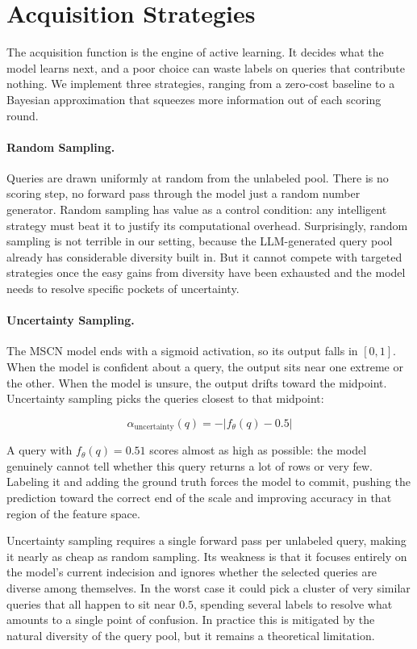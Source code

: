 \section{Acquisition Strategies}

The acquisition function is the engine of active learning. It decides what the model learns next, and a poor choice can waste labels on queries that contribute nothing. We implement three strategies, ranging from a zero-cost baseline to a Bayesian approximation that squeezes more information out of each scoring round.

\paragraph{Random Sampling.} Queries are drawn uniformly at random from the unlabeled pool. There is no scoring step, no forward pass through the model just a random number generator. Random sampling has value as a control condition: any intelligent strategy must beat it to justify its computational overhead. Surprisingly, random sampling is not terrible in our setting, because the LLM-generated query pool already has considerable diversity built in. But it cannot compete with targeted strategies once the easy gains from diversity have been exhausted and the model needs to resolve specific pockets of uncertainty.

\paragraph{Uncertainty Sampling.} The MSCN model ends with a sigmoid activation, so its output falls in $[0, 1]$. When the model is confident about a query, the output sits near one extreme or the other. When the model is unsure, the output drifts toward the midpoint. Uncertainty sampling picks the queries closest to that midpoint:

\begin{equation}
\alpha_{\text{uncertainty}}(q) = -\left| f_\theta(q) - 0.5 \right|
\end{equation}

A query with $f_\theta(q) = 0.51$ scores almost as high as possible: the model genuinely cannot tell whether this query returns a lot of rows or very few. Labeling it and adding the ground truth forces the model to commit, pushing the prediction toward the correct end of the scale and improving accuracy in that region of the feature space.

Uncertainty sampling requires a single forward pass per unlabeled query, making it nearly as cheap as random sampling. Its weakness is that it focuses entirely on the model's current indecision and ignores whether the selected queries are diverse among themselves. In the worst case it could pick a cluster of very similar queries that all happen to sit near $0.5$, spending several labels to resolve what amounts to a single point of confusion. In practice this is mitigated by the natural diversity of the query pool, but it remains a theoretical limitation.

